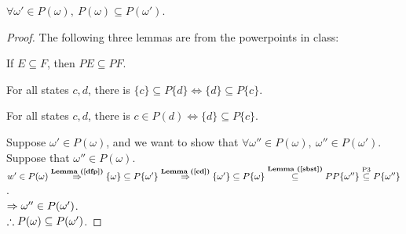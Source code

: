 \newcommand{\w}{\omega}

\begin{pr}
$\forall\w'\in P(\w),\ P(\w)\subseteq P(\w')$.
\begin{proof}

The following three lemmas are from the powerpoints in class:

\begin{lm}\label{sbst}
If $E\subseteq F$, then $PE\subseteq PF$.
\end{lm}

\begin{lm}\label{cd}
For all states $c, d$, there is $\{c\}\subseteq P\{d\}\iff\{d\}\subseteq P\{c\}$.
\end{lm}

\begin{lm}\label{dfp}
For all states $c, d$, there is $c\in P(d)\iff\{d\}\subseteq P\{c\}$.
\end{lm}

Suppose $\w'\in P(\w)$, and we want to show that $\forall\w''\in P(\w),\ \w''\in P(\w')$.\\
Suppose that $\w''\in P(\w)$.\\
$w'\in P(\w)\overtext{\rflm{dfp}}\then\{\w\}\subseteq P\{\w'\}\overtext{\rflm{cd}}\then\{\w'\}\subseteq P\{\w\}\overtext{\rflm{sbst}}\subseteq PP\{\w''\}\overtext{P3}\subseteq P\{\w''\}$.\\
$\then\w''\in P(\w')$.\\
$\so P(\w)\subseteq P(\w')$.
\end{proof}
\end{pr}
